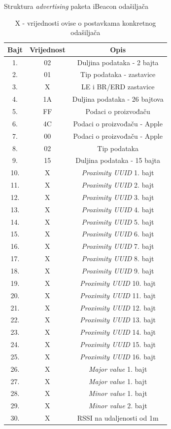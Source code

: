 \begin{table}[H]
\centering
\caption{Struktura \textit{advertising} paketa iBeacon odašiljača}
\label{tbl:iBeacon}
	\begin{tabular}{*{3}{c}}
	\hline 
	Bajt & Vrijednost & Opis \\ 
	\hline 
	1. & 02 & Duljina podataka - 2 bajta \\ 
	2. & 01 & Tip podataka - zastavice \\ 
	3. & X & LE i BR/ERD zastavice \\ 
	4. & 1A & Duljina podataka - 26 bajtova \\ 
	5. & FF & Podaci o proizvođaču \\ 
	6. & 4C & Podaci o proizvođaču - Apple \\ 
	7. & 00 & Podaci o proizvođaču - Apple \\ 
	8. & 02 & Tip podataka \\ 
	9. & 15 & Duljina podataka - 15 bajta \\ 
	10. & X & \textit{Proximity UUID} 1. bajt \\ 
	11. & X & \textit{Proximity UUID} 2. bajt \\ 
	12. & X & \textit{Proximity UUID} 3. bajt \\ 
	13. & X & \textit{Proximity UUID} 4. bajt \\ 
	14. & X & \textit{Proximity UUID} 5. bajt \\ 
	15. & X & \textit{Proximity UUID} 6. bajt \\ 
	16. & X & \textit{Proximity UUID} 7. bajt \\ 
	17. & X & \textit{Proximity UUID} 8. bajt \\ 
	18. & X & \textit{Proximity UUID} 9. bajt \\ 
	19. & X & \textit{Proximity UUID} 10. bajt \\ 
	20. & X & \textit{Proximity UUID} 11. bajt \\ 
	21. & X & \textit{Proximity UUID} 12. bajt \\  
	22. & X & \textit{Proximity UUID} 13. bajt \\ 
	23. & X & \textit{Proximity UUID} 14. bajt \\  
	24. & X & \textit{Proximity UUID} 15. bajt \\ 
	25. & X & \textit{Proximity UUID} 16. bajt \\ 
	26. & X & \textit{Major value} 1. bajt \\ 
	27. & X & \textit{Major value} 1. bajt \\ 
	28. & X & \textit{Minor value} 1. bajt \\  
	29. & X & \textit{Minor value} 2. bajt \\ 
	30. & X & RSSI na udaljenosti od 1m \\ 
	\hline 
	\end{tabular}
	\caption*{X - vrijednosti ovise o postavkama konkretnog odašiljača}
\end{table}

